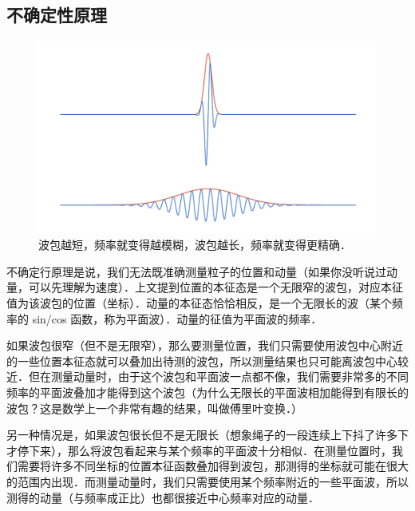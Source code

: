 \subsection{不确定性原理}

\begin{figure}[ht]
\centering
\includegraphics[width=14cm]{./figures/QM05.pdf}
\caption{波包越短，频率就变得越模糊，波包越长，频率就变得更精确．} \label{QM0_fig5}
\end{figure}

不确定行原理是说，我们无法既准确测量粒子的位置和动量（如果你没听说过动量，可以先理解为速度）．上文提到位置的本征态是一个无限窄的波包，对应本征值为该波包的位置（坐标）．动量的本征态恰恰相反，是一个无限长的波（某个频率的 sin/cos 函数，称为平面波）．动量的征值为平面波的频率．

如果波包很窄（但不是无限窄），那么要测量位置，我们只需要使用波包中心附近的一些位置本征态就可以叠加出待测的波包，所以测量结果也只可能离波包中心较近．但在测量动量时，由于这个波包和平面波一点都不像，我们需要非常多的不同频率的平面波叠加才能得到这个波包（为什么无限长的平面波相加能得到有限长的波包？这是数学上一个非常有趣的结果，叫做傅里叶变换．）

另一种情况是，如果波包很长但不是无限长（想象绳子的一段连续上下抖了许多下才停下来），那么将波包看起来与某个频率的平面波十分相似．在测量位置时，我们需要将许多不同坐标的位置本征函数叠加得到波包，那测得的坐标就可能在很大的范围内出现．而测量动量时，我们只需要使用某个频率附近的一些平面波，所以测得的动量（与频率成正比）也都很接近中心频率对应的动量．

